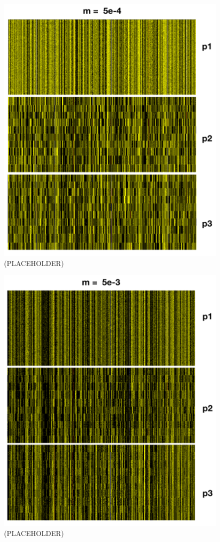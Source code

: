 \documentclass{article}
\begin{document}
\begin{figure}[h!tb]
	\begin{center}
  		\includegraphics[width=0.7\linewidth]{plotlyPlots/Haplo5e-4.png}
  		\caption{(PLACEHOLDER)
		}
  		\label{fig:Haplo2}
	\end{center}
\end{figure}

\begin{figure}[h!tb]
	\begin{center}
  		\includegraphics[width=0.7\linewidth]{plotlyPlots/Haplo5e-3.png}
  		\caption{(PLACEHOLDER)
		}
  		\label{fig:Haplo3}
	\end{center}
\end{figure}
\end{document}
